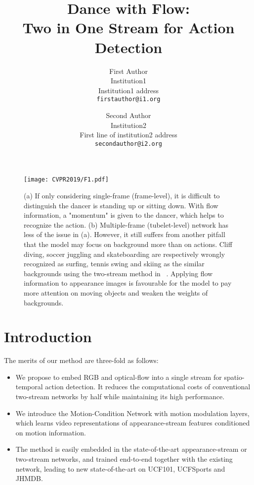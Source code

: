 \documentclass[10pt,twocolumn,letterpaper]{article}
\begin{document}
\title{ Dance with Flow: \\Two in One Stream for Action Detection }

\author{First Author\\
Institution1\\
Institution1 address\\
{\tt\small firstauthor@i1.org}
\and
Second Author\\
Institution2\\
First line of institution2 address\\
{\tt\small secondauthor@i2.org}
}

\maketitle




\begin{abstract}
   
\end{abstract}


\begin{figure*}[ht]
\centering
\texttt{[image: CVPR2019/F1.pdf]}
\caption{(a) If only considering single-frame (frame-level), it is difficult to distinguish the dancer is standing up or sitting down. With flow information, a "momentum" is given to the dancer, which helps to recognize the action. (b) Multiple-frame (tubelet-level) network has less of the issue in (a). However, it still suffers from another pitfall that the model may focus on background more than on actions. Cliff diving, soccer juggling and skateboarding are respectively wrongly recognized as surfing, tennis swing and skiing as the similar backgrounds using the two-stream method in ~\cite{Singh2017}. Applying flow information to appearance images is favourable for the model to pay more attention on moving objects and weaken the weights of backgrounds.}
\label{Fig:motivation}
\end{figure*}


\section{Introduction}

The merits of our method are three-fold as follows:
\begin{itemize}
    \item We propose to embed RGB and optical-flow into a single stream for spatio-temporal action detection. It reduces the computational costs of conventional two-stream networks by half while maintaining its high performance.
    \item We introduce the Motion-Condition Network with motion modulation layers, which learns video representations of appearance-stream features conditioned on motion information. 
    \item The method is easily embedded in the state-of-the-art appearance-stream or two-stream networks, and trained end-to-end together with the existing network, leading to new state-of-the-art on UCF101, UCFSports and JHMDB. 
\end{itemize}
\end{document}
